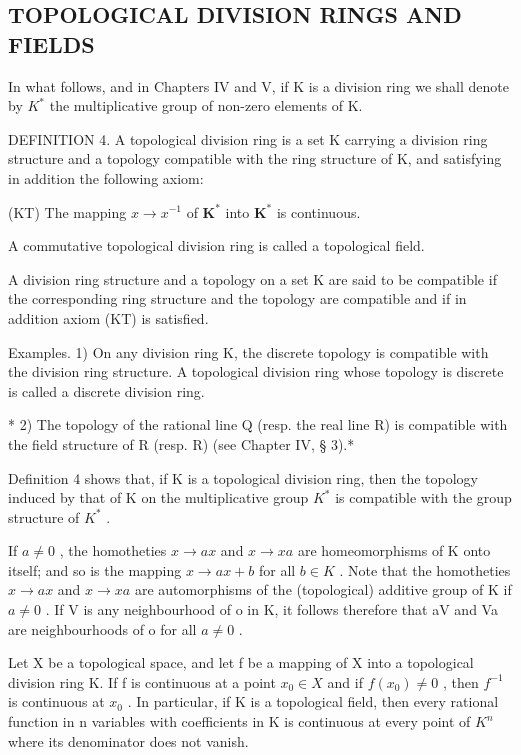 \subsection{TOPOLOGICAL DIVISION RINGS AND FIELDS}

In what follows, and in Chapters IV and V, if K is a division ring we shall denote by \(K^{*}\) the multiplicative group of non-zero elements of K.

DEFINITION 4. A topological division ring is a set K carrying a division ring structure and a topology compatible with the ring structure of K, and satisfying in addition the following axiom:

(KT) The mapping \(x \to x^{-1}\) of \(\mathbf{K}^*\) into \(\mathbf{K}^*\) is continuous.

A commutative topological division ring is called a topological field.

A division ring structure and a topology on a set K are said to be compatible if the corresponding ring structure and the topology are compatible and if in addition axiom (KT) is satisfied.

Examples. 1) On any division ring K, the discrete topology is compatible with the division ring structure. A topological division ring whose topology is discrete is called a discrete division ring.

* 2) The topology of the rational line Q (resp. the real line R) is compatible with the field structure of R (resp. R) (see Chapter IV, § 3).*

Definition 4 shows that, if K is a topological division ring, then the topology induced by that of K on the multiplicative group \(K^{*}\) is compatible with the group structure of \(K^{*}\) .

If \(a \neq 0\) , the homotheties \(x \rightarrow ax\) and \(x \rightarrow xa\) are homeomorphisms of K onto itself; and so is the mapping \(x \rightarrow ax + b\) for all \(b \in K\) . Note that the homotheties \(x \rightarrow ax\) and \(x \rightarrow xa\) are automorphisms of the (topological) additive group of K if \(a \neq 0\) . If V is any neighbourhood of o in K, it follows therefore that aV and Va are neighbourhoods of o for all \(a \neq 0\) .

Let X be a topological space, and let f be a mapping of X into a topological division ring K. If f is continuous at a point \(x_{0} \in X\) and if \(f(x_{0}) \neq 0\) , then \(f^{-1}\) is continuous at \(x_{0}\) . In particular, if K is a topological field, then every rational function in n variables with coefficients in K is continuous at every point of \(K^{n}\) where its denominator does not vanish.

